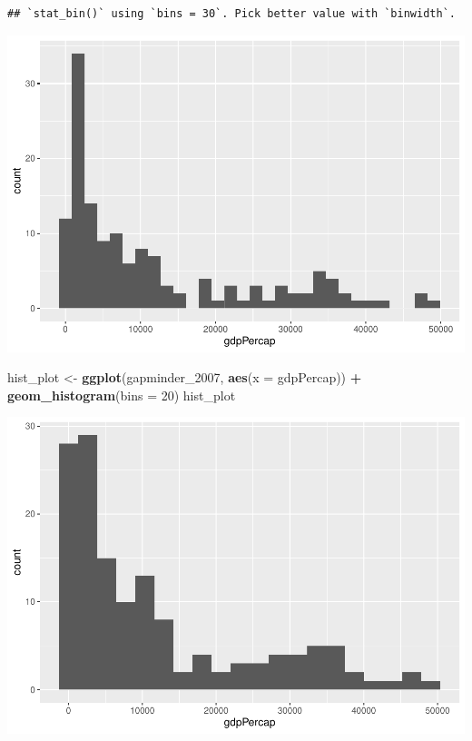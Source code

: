 \documentclass[
]{book}
\newenvironment{Shaded}{\begin{snugshade}}{\end{snugshade}}
\newcommand{\AttributeTok}[1]{\textcolor[rgb]{0.13,0.29,0.53}{#1}}
\newcommand{\DecValTok}[1]{\textcolor[rgb]{0.00,0.00,0.81}{#1}}
\newcommand{\FunctionTok}[1]{\textcolor[rgb]{0.13,0.29,0.53}{\textbf{#1}}}
\newcommand{\NormalTok}[1]{#1}
\newcommand{\OtherTok}[1]{\textcolor[rgb]{0.56,0.35,0.01}{#1}}
\newcommand{\SpecialCharTok}[1]{\textcolor[rgb]{0.81,0.36,0.00}{\textbf{#1}}}
\theoremstyle{definition}
\theoremstyle{definition}
\theoremstyle{definition}
\theoremstyle{definition}
\theoremstyle{remark}
\begin{document}
\begin{verbatim}
## `stat_bin()` using `bins = 30`. Pick better value with `binwidth`.
\end{verbatim}

\includegraphics{202402211401-R_files/figure-latex/unnamed-chunk-21-1.pdf}

\begin{Shaded}
\begin{Highlighting}[]
\NormalTok{hist\_plot }\OtherTok{\textless{}{-}} \FunctionTok{ggplot}\NormalTok{(gapminder\_2007, }\FunctionTok{aes}\NormalTok{(}\AttributeTok{x =}\NormalTok{ gdpPercap)) }\SpecialCharTok{+}
  \FunctionTok{geom\_histogram}\NormalTok{(}\AttributeTok{bins =} \DecValTok{20}\NormalTok{)}
\NormalTok{hist\_plot}
\end{Highlighting}
\end{Shaded}

\includegraphics{202402211401-R_files/figure-latex/unnamed-chunk-21-2.pdf}
\end{document}
